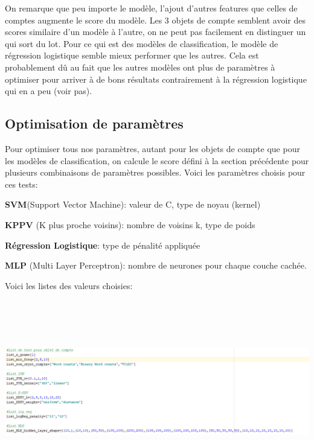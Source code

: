 \documentclass[12pt,french]{article}
\begin{document}
On remarque que peu importe le modèle, l'ajout d'autres features que celles de comptes augmente le score du modèle. Les 3 objets de compte semblent avoir des scores similaire d'un modèle à l'autre, on ne peut pas facilement en distinguer un qui sort du lot. Pour ce qui est des modèles de classification, le modèle de régression logistique semble mieux performer que les autres. Cela est probablement dû au fait que les autres modèles ont plus de paramètres à optimiser pour arriver à de bons résultats contrairement à la régression logistique qui en a peu (voir pas).


\subsection*{Optimisation de paramètres}


Pour optimiser tous nos paramètres, autant pour les objets de compte que pour les modèles de classification, on calcule le score défini à la section précédente pour plusieurs combinaisons de paramètres possibles. Voici les paramètres choisis pour ces tests:

\begin{description}
\item \textbf{SVM}(Support Vector Machine): valeur de C, type de noyau (kernel)
\item \textbf{KPPV} (K plus proche voisins): nombre de voisins k, type de poids
\item \textbf{Régression Logistique}: type de pénalité appliquée
\item \textbf{MLP} (Multi Layer Perceptron): nombre de neurones pour chaque couche cachée.
\end{description}
Voici les listes des valeurs choisies:

\includegraphics[width=\linewidth,height=8cm]{list_param}
\end{document}
